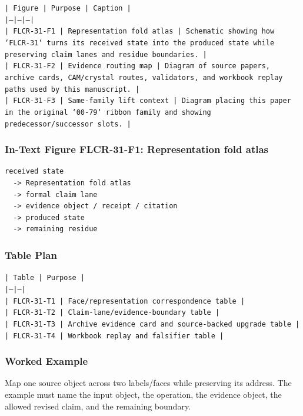 \documentclass[11pt]{article}
\begin{document}
\noindent\texttt{| Figure | Purpose | Caption |}\\
\noindent\texttt{|---|---|---|}\\
\noindent\texttt{| FLCR-31-F1 | Representation fold atlas | Schematic showing how `FLCR-31` turns its received state into the produced state while preserving claim lanes and residue boundaries. |}\\
\noindent\texttt{| FLCR-31-F2 | Evidence routing map | Diagram of source papers, archive cards, CAM/crystal routes, validators, and workbook replay paths used by this manuscript. |}\\
\noindent\texttt{| FLCR-31-F3 | Same-family lift context | Diagram placing this paper in the original `00-79` ribbon family and showing predecessor/successor slots. |}\\

\subsubsection*{In-Text Figure FLCR-31-F1: Representation fold atlas}

\begin{verbatim}
received state
  -> Representation fold atlas
  -> formal claim lane
  -> evidence object / receipt / citation
  -> produced state
  -> remaining residue
\end{verbatim}

\subsubsection*{Table Plan}

\noindent\texttt{| Table | Purpose |}\\
\noindent\texttt{|---|---|}\\
\noindent\texttt{| FLCR-31-T1 | Face/representation correspondence table |}\\
\noindent\texttt{| FLCR-31-T2 | Claim-lane/evidence-boundary table |}\\
\noindent\texttt{| FLCR-31-T3 | Archive evidence card and source-backed upgrade table |}\\
\noindent\texttt{| FLCR-31-T4 | Workbook replay and falsifier table |}\\

\subsubsection*{Worked Example}

Map one source object across two labels/faces while preserving its address. The example must name the input object, the operation,
the evidence object, the allowed revised claim, and the remaining boundary.
\end{document}
